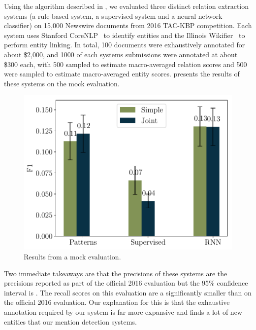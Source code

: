 Using the algorithm described in , we evaluated three distinct relation extraction systems (a rule-based system, a supervised system and a neural network classifier) on 15,000 Newswire documents from 2016 TAC-KBP competition.
Each system uses Stanford CoreNLP~\citep{} to identify entities and the Illinois Wikifier~\citep{} to perform entity linking. 
In total, 100 documents were exhaustively annotated for about \$2,000, and 1000 of each systems submissions were annotated at about \$300 each, with 500 sampled to estimate macro-averaged relation scores and 500 were sampled to estimate macro-averaged entity scores.
 presents the results of these systems on the mock evaluation.

\begin{figure}[t]
  \centering
  \includegraphics[width=\columnwidth]{figures/kbp2016/kbp2016_f1}
  \caption{\label{fig:evaluation-results} Results from a mock evaluation.}
\end{figure}

%  

Two immediate takeaways are that the precisions of these systems are  the precisions reported as part of the official 2016 evaluation but the 95\% confidence interval is .
The recall scores on this evaluation are a significantly smaller than on the official 2016 evaluation.
Our explanation for this is that the exhaustive annotation required by our system is far more expansive and finds a lot of new entities that our mention detection systems. 
